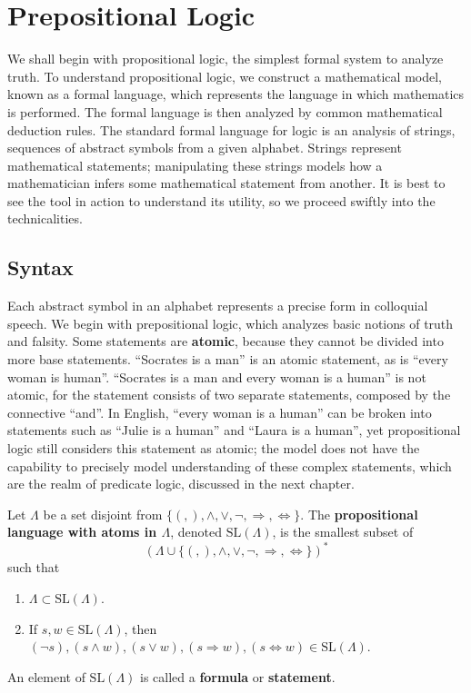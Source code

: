 \chapter{Prepositional Logic}

We shall begin with propositional logic, the simplest formal system to analyze truth. To understand propositional logic, we construct a mathematical model, known as a formal language, which represents the language in which mathematics is performed. The formal language is then analyzed by common mathematical deduction rules. The standard formal language for logic is an analysis of strings, sequences of abstract symbols from a given alphabet. Strings represent mathematical statements; manipulating these strings models how a mathematician infers some mathematical statement from another. It is best to see the tool in action to understand its utility, so we proceed swiftly into the technicalities.

\section{Syntax}

Each abstract symbol in an alphabet represents a precise form in colloquial speech. We begin with prepositional logic, which analyzes basic notions of truth and falsity. Some statements are {\bf atomic}, because they cannot be divided into more base statements. ``Socrates is a man'' is an atomic statement, as is ``every woman is human''. ``Socrates is a man and every woman is a human'' is not atomic, for the statement consists of two separate statements, composed by the connective ``and''. In English, ``every woman is a human'' can be broken into statements such as ``Julie is a human'' and ``Laura is a human'', yet propositional logic still considers this statement as atomic; the model does not have the capability to precisely model understanding of these complex statements, which are the realm of predicate logic, discussed in the next chapter.

Let $\Lambda$ be a set disjoint from $\{ (, ), \wedge, \vee, \neg, \Rightarrow, \Leftrightarrow \}$. The {\bf propositional language with atoms in $\Lambda$}, denoted $\text{SL}(\Lambda)$, is the smallest subset of
%
\[ (\Lambda \cup \{ (, ), \wedge, \vee, \neg, \Rightarrow, \Leftrightarrow \})^* \]
%
such that
%
\begin{enumerate}
    \item $\Lambda \subset \text{SL}(\Lambda)$.
    \item If $s, w \in \text{SL}(\Lambda)$, then $(\neg s), (s \wedge w), (s \vee w), (s \Rightarrow w), (s \Leftrightarrow w) \in \text{SL}(\Lambda)$.
\end{enumerate}
%
An element of $\text{SL}(\Lambda)$ is called a {\bf formula} or {\bf statement}.

